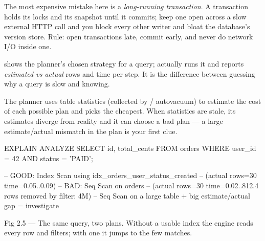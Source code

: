 \begin{perfnote}
The most expensive mistake here is a \emph{long-running transaction}. A transaction holds its locks and its snapshot until it commits; keep one open across a slow external HTTP call and you block every other writer and bloat the database's version store. Rule: open transactions late, commit early, and never do network I/O inside one.
\end{perfnote}


  shows the planner's chosen strategy for a query;  actually runs it and reports \emph{estimated vs actual} rows and time per step. It is the difference between guessing why a query is slow and knowing.

 The planner uses table statistics (collected by  / autovacuum) to estimate the cost of each possible plan and picks the cheapest. When statistics are stale, its estimates diverge from reality and it can choose a bad plan --- a large estimate/actual mismatch in the plan is your first clue.

\begin{sqlbox}
EXPLAIN ANALYZE
SELECT id, total_cents FROM orders
WHERE user_id = 42 AND status = 'PAID';

-- GOOD: Index Scan using idx_orders_user_status_created
--       (actual rows=30  time=0.05..0.09)
-- BAD:  Seq Scan on orders
--       (actual rows=30  time=0.02..812.4  rows removed by filter: 4M)
-- Seq Scan on a large table + big estimate/actual gap = investigate
\end{sqlbox}

\begin{wbfigure}{Fig 2.5 — The same query, two plans. Without a usable index the engine reads every row and filters; with one it jumps to the few matches.}
\end{wbfigure}

